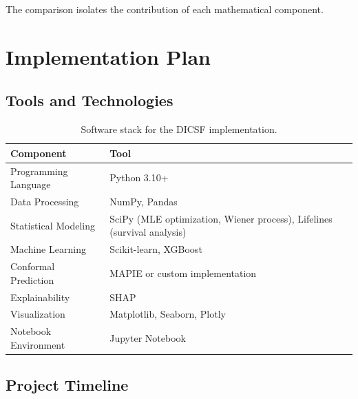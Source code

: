 \documentclass[12pt, a4paper]{article}
\begin{document}
The comparison isolates the contribution of each mathematical component.


\section{Implementation Plan}

\subsection{Tools and Technologies}

\begin{table}[H]
    \centering
    \caption{Software stack for the DICSF implementation.}
    \label{tab:tools}
    \begin{tabularx}{\textwidth}{l X}
        \toprule
        \textbf{Component} & \textbf{Tool} \\
        \midrule
        Programming Language & Python 3.10+ \\
        Data Processing & NumPy, Pandas \\
        Statistical Modeling & SciPy (MLE optimization, Wiener process), Lifelines (survival analysis) \\
        Machine Learning & Scikit-learn, XGBoost \\
        Conformal Prediction & MAPIE or custom implementation \\
        Explainability & SHAP \\
        Visualization & Matplotlib, Seaborn, Plotly \\
        Notebook Environment & Jupyter Notebook \\
        \bottomrule
    \end{tabularx}
\end{table}

\subsection{Project Timeline}
\end{document}
